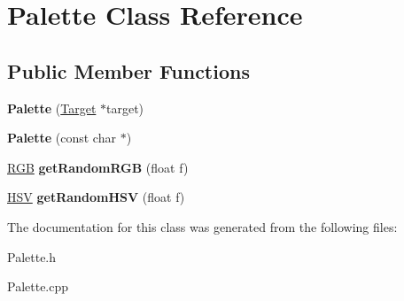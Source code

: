 \hypertarget{class_palette}{\section{Palette Class Reference}
\label{class_palette}
}
\subsection*{Public Member Functions}
\begin{DoxyCompactItemize}
\item 
\hypertarget{class_palette_a9e7d1cfc83132e54f881c95acf0cb0d9}{{\bfseries Palette} (\hyperlink{class_target}{Target} $\ast$target)}\label{class_palette_a9e7d1cfc83132e54f881c95acf0cb0d9}

\item 
\hypertarget{class_palette_ab861218bb6b4b64f24c774deaf26cada}{{\bfseries Palette} (const char $\ast$)}\label{class_palette_ab861218bb6b4b64f24c774deaf26cada}

\item 
\hypertarget{class_palette_abec7160109e458ab445ba1eaf752ab85}{\hyperlink{struct_r_g_b}{R\-G\-B} {\bfseries get\-Random\-R\-G\-B} (float f)}\label{class_palette_abec7160109e458ab445ba1eaf752ab85}

\item 
\hypertarget{class_palette_a11248e33e13b761d483f251ec21d9d11}{\hyperlink{struct_h_s_v}{H\-S\-V} {\bfseries get\-Random\-H\-S\-V} (float f)}\label{class_palette_a11248e33e13b761d483f251ec21d9d11}

\end{DoxyCompactItemize}


The documentation for this class was generated from the following files\-:\begin{DoxyCompactItemize}
\item 
Palette.\-h\item 
Palette.\-cpp\end{DoxyCompactItemize}

